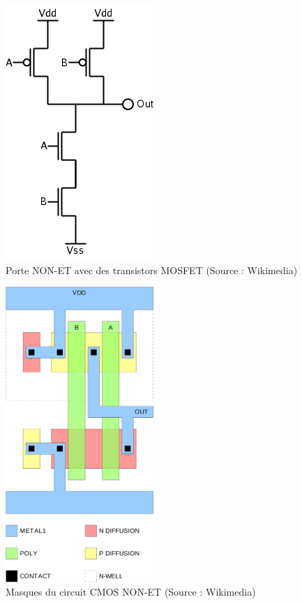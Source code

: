 \documentclass[a4paper,11pt]{book}
\theoremstyle{definition}
\begin{document}
\begin{figure}
\centering
\includegraphics[width=0.5\textwidth]{media/ImplementationGates/CMOS_NAND.png}
\caption{Porte NON-ET avec des transistors MOSFET (Source : Wikimedia)}
\label{fig:NON-ET_MOS}
\end{figure}

\begin{figure}
\centering
\includegraphics[width=0.5\textwidth]{media/ImplementationGates/2000px-CMOS_NAND_Layout.svg.png}
\caption{Masques du circuit CMOS NON-ET (Source : Wikimedia)}
\label{fig:NON-ET_CMOS_MASK}
\end{figure}
\end{document}
